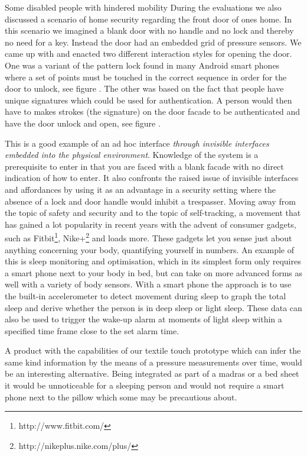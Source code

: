 Some disabled people with hindered mobility 
\blank
During the evaluations we also discussed a scenario of home security regarding the front door of ones home.
In this scenario we imagined a blank door with no handle and no lock and thereby no need for a key.
Instead the door had an embedded grid of pressure sensors.
We came up with and enacted two different interaction styles for opening the door.
One was a variant of the pattern lock found in many Android smart phones where a set of points must be touched in the correct sequence in order for the door to unlock, see figure .
The other was based on the fact that people have unique signatures which could be used for authentication.
A person would then have to makes strokes (the signature) on the door facade to be authenticated and have the door unlock and open, see figure .

This is a good example of an ad hoc interface \emph{through invisible interfaces embedded into the physical environment}.
Knowledge of the system is a prerequisite to enter in that you are faced with a blank facade with no direct indication of how to enter.
It also confronts the raised issue of invisible interfaces and affordances by using it as an advantage in a security setting where the absence of a lock and door handle would inhibit a trespasser.
\blank
Moving away from the topic of safety and security and to the topic of self-tracking, a movement that has gained a lot popularity in recent years with the advent of consumer gadgets, such as Fitbit\footnote{http://www.fitbit.com/}, Nike+\footnote{http://nikeplus.nike.com/plus/} and loads more. 
These gadgets let you sense just about anything concerning your body, quantifying yourself in numbers.
An example of this is sleep monitoring and optimisation, which in its simplest form only requires a smart phone next to your body in bed, but can take on more advanced forms as well with a variety of body sensors.
With a smart phone the approach is to use the built-in accelerometer to detect movement during sleep to graph the total sleep and derive whether the person is in deep sleep or light sleep.
These data can also be used to trigger the wake-up alarm at moments of light sleep within a specified time frame close to the set alarm time.

A product with the capabilities of our textile touch prototype which can infer the same kind information by the means of a pressure measurements over time, would be an interesting alternative.
Being integrated as part of a madras or a bed sheet it would be unnoticeable for a sleeping person and would not require a smart phone next to the pillow which some may be precautious about.

